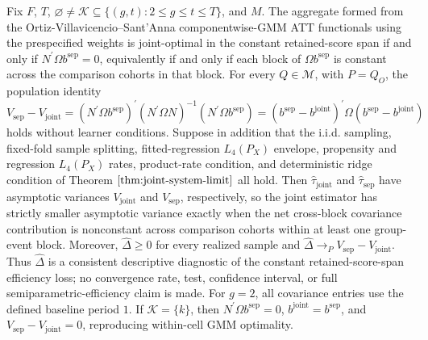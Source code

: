 Fix \(F\), \(T\), \(\varnothing\ne\mathcal K\subseteq\{(g,t):2\le g\le t\le T\}\), and \(M\). The aggregate formed from the Ortiz-Villavicencio--Sant'Anna componentwise-GMM ATT functionals using the prespecified weights is joint-optimal in the constant retained-score span if and only if \(N^{\prime}\Omega b^{\mathrm{sep}}=0\), equivalently if and only if each block of \(\Omega b^{\mathrm{sep}}\) is constant across the comparison cohorts in that block. For every \(Q\in\mathcal M\), with \(P=Q_O\), the population identity
\[
V_{\mathrm{sep}}-V_{\mathrm{joint}}
=(N^{\prime}\Omega b^{\mathrm{sep}})^{\prime}(N^{\prime}\Omega N)^{-1}(N^{\prime}\Omega b^{\mathrm{sep}})
=(b^{\mathrm{sep}}-b^{\mathrm{joint}})^{\prime}\Omega(b^{\mathrm{sep}}-b^{\mathrm{joint}})
\]
holds without learner conditions. Suppose in addition that the i.i.d. sampling, fixed-fold sample splitting, fitted-regression \(L_4(P_X)\) envelope, propensity and regression \(L_4(P_X)\) rates, product-rate condition, and deterministic ridge condition of Theorem \(\ref{thm:joint-system-limit}\) all hold. Then \(\widehat\tau_{\mathrm{joint}}\) and \(\widehat\tau_{\mathrm{sep}}\) have asymptotic variances \(V_{\mathrm{joint}}\) and \(V_{\mathrm{sep}}\), respectively, so the joint estimator has strictly smaller asymptotic variance exactly when the net cross-block covariance contribution is nonconstant across comparison cohorts within at least one group-event block. Moreover, \(\widehat\Delta\ge0\) for every realized sample and \(\widehat\Delta\to_P V_{\mathrm{sep}}-V_{\mathrm{joint}}\). Thus \(\widehat\Delta\) is a consistent descriptive diagnostic of the constant retained-score-span efficiency loss; no convergence rate, test, confidence interval, or full semiparametric-efficiency claim is made. For \(g=2\), all covariance entries use the defined baseline period \(1\). If \(\mathcal K=\{k\}\), then \(N^{\prime}\Omega b^{\mathrm{sep}}=0\), \(b^{\mathrm{joint}}=b^{\mathrm{sep}}\), and \(V_{\mathrm{sep}}-V_{\mathrm{joint}}=0\), reproducing within-cell GMM optimality.